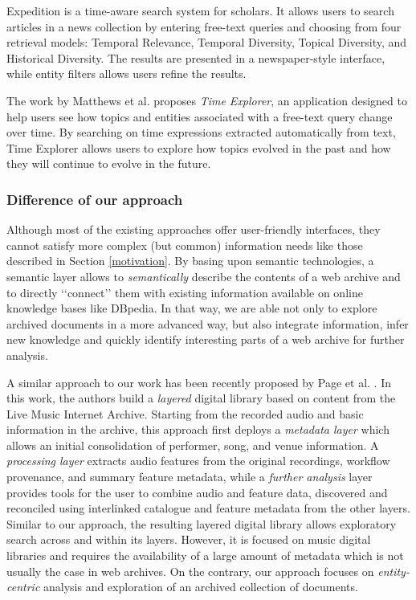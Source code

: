 \documentclass[twocolumn]{svjour3}
\newcommand{\q}[1]{\lq\lq{}{}#1\rq\rq{}{}}
\begin{document}
Expedition \cite{singh2016expedition} is a time-aware search system for scholars.
It allows users to search articles in a news collection
by entering free-text queries and choosing from four retrieval models:
Temporal Relevance, Temporal Diversity, Topical Diversity, and Historical Diversity.
The results are presented in a
newspaper-style interface, while entity filters allows users refine the results.

The work by Matthews et al. \cite{matthews2010searching} proposes {\em Time Explorer},
an application designed to help users see how topics and entities associated
with a free-text query change over time.
By searching on time expressions
extracted automatically from text, Time Explorer
allows users to explore how topics evolved in the
past and how they will continue to evolve in the future.



\subsubsection*{Difference of our approach}

Although most of the existing approaches offer user-friendly interfaces,
they cannot satisfy more complex (but common) information needs
like those described in Section \ref{motivation}.
By basing upon semantic technologies, a semantic layer
allows to {\em semantically} describe the contents of a web archive
and to directly \q{connect} them with existing information available
on online knowledge bases like DBpedia.
In that way, we are able not only to explore archived documents in a more advanced way,
but also integrate information, infer new knowledge and quickly
identify interesting parts of a web archive for further analysis.

A similar approach to our work has been recently proposed by Page et al. \cite{page2017realising}.
In this work, the authors build a {\em layered} digital library
based on content from the Live Music Internet Archive.
Starting from the recorded audio and basic information
in the archive, this approach first deploys a {\em metadata layer} which
allows an initial consolidation of performer, song,
and venue information. A {\em processing layer} extracts audio features
from the original recordings, workflow provenance, and summary
feature metadata, while a {\em further analysis} layer provides tools for the
user to combine audio and feature data, discovered and reconciled
using interlinked catalogue and feature metadata from the other layers.
Similar to our approach, the resulting layered digital library
allows exploratory search across and within its layers.
However, it is focused on music digital libraries and
requires the availability of a large amount of metadata
which is not usually the case in web archives.
On the contrary, our approach focuses on {\em entity-centric} analysis and exploration of
an archived collection of documents.
\end{document}
